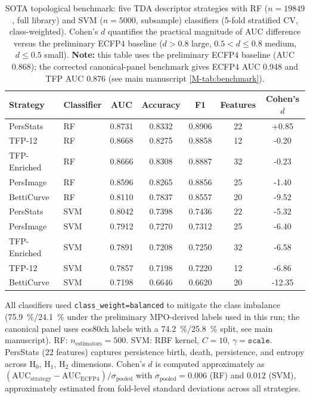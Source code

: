 \documentclass[11pt,a4paper]{article}
\begin{document}
\begin{table}[htbp]
\centering
\caption{SOTA topological benchmark: five TDA descriptor strategies with RF ($n = \num{19849}$, full library) and SVM ($n = \num{5000}$, subsample) classifiers (5-fold stratified CV, class-weighted). Cohen's $d$ quantifies the practical magnitude of AUC difference versus the preliminary ECFP4 baseline ($d > 0.8$ large, $0.5 < d \leq 0.8$ medium, $d \leq 0.5$ small). \textbf{Note:} this table uses the preliminary ECFP4 baseline (AUC \num{0.868}); the corrected canonical-panel benchmark gives ECFP4 AUC \num{0.948} and TFP AUC \num{0.876} (see main manuscript \cref{M-tab:benchmark}).}
\label{SM-tab:sota}
\begin{tabularx}{\textwidth}{l l S[table-format=1.4] S[table-format=1.4] S[table-format=1.4] S[table-format=1.0] S[table-format=+1.2]}
\toprule
{Strategy} & {Classifier} & {AUC} & {Accuracy} & {F1} & {Features} & {Cohen's $d$} \\
\midrule
PersStats & RF & 0.8731 & 0.8332 & 0.8906 & 22 & +0.85 \\
TFP-12 & RF & 0.8668 & 0.8275 & 0.8858 & 12 & -0.20 \\
TFP-Enriched & RF & 0.8666 & 0.8308 & 0.8887 & 32 & -0.23 \\
PersImage & RF & 0.8596 & 0.8265 & 0.8856 & 25 & -1.40 \\
BettiCurve & RF & 0.8110 & 0.7837 & 0.8557 & 20 & -9.52 \\
PersStats & SVM & 0.8042 & 0.7398 & 0.7436 & 22 & -5.32 \\
PersImage & SVM & 0.7912 & 0.7270 & 0.7312 & 25 & -6.40 \\
TFP-Enriched & SVM & 0.7891 & 0.7208 & 0.7250 & 32 & -6.58 \\
TFP-12 & SVM & 0.7857 & 0.7198 & 0.7220 & 12 & -6.86 \\
BettiCurve & SVM & 0.7198 & 0.6646 & 0.6620 & 20 & -12.35 \\
\bottomrule
\end{tabularx}
\vspace{1mm}
\footnotesize All classifiers used \texttt{class\_weight=balanced} to mitigate the class imbalance (\qty{75.9}{\percent}/\qty{24.1}{\percent} under the preliminary MPO-derived labels used in this run; the canonical panel uses eos80ch labels with a \qty{74.2}{\percent}/\qty{25.8}{\percent} split, see main manuscript). RF: $n_{\text{estimators}} = 500$. SVM: RBF kernel, $C = 10$, $\gamma = \texttt{scale}$. PersStats (22 features) captures persistence birth, death, persistence, and entropy across H$_0$, H$_1$, H$_2$ dimensions. Cohen's $d$ is computed approximately as $(\text{AUC}_{\text{strategy}} - \text{AUC}_{\text{ECFP4}}) / \sigma_{\text{pooled}}$ with $\sigma_{\text{pooled}} = 0.006$ (RF) and $0.012$ (SVM), approximately estimated from fold-level standard deviations across all strategies.
\end{table}
\end{document}
